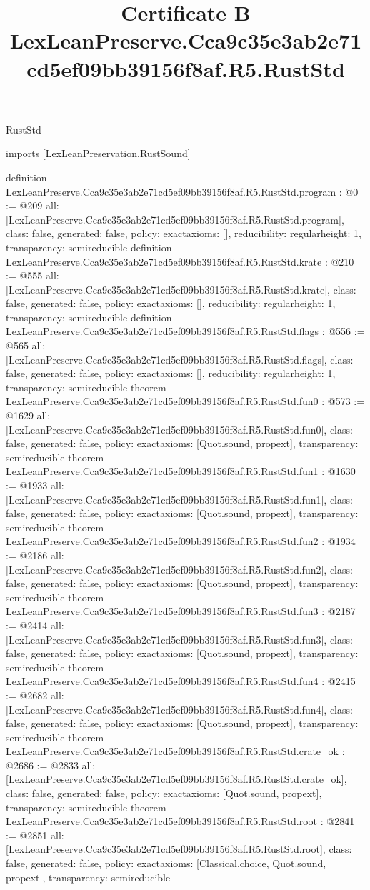 \begin{lexlean}{RustStd}
\title{Certificate B LexLeanPreserve.Cca9c35e3ab2e71cd5ef09bb39156f8af.R5.RustStd}
\begin{coremodule}
imports [LexLeanPreservation.RustSound]

definition LexLeanPreserve.Cca9c35e3ab2e71cd5ef09bb39156f8af.R5.RustStd.program : @0 := @209 {
  all: [LexLeanPreserve.Cca9c35e3ab2e71cd5ef09bb39156f8af.R5.RustStd.program],
  class: false,
  generated: false,
  policy: exact{axioms: []},
  reducibility: regular{height: 1},
  transparency: semireducible
}
definition LexLeanPreserve.Cca9c35e3ab2e71cd5ef09bb39156f8af.R5.RustStd.krate : @210 := @555 {
  all: [LexLeanPreserve.Cca9c35e3ab2e71cd5ef09bb39156f8af.R5.RustStd.krate],
  class: false,
  generated: false,
  policy: exact{axioms: []},
  reducibility: regular{height: 1},
  transparency: semireducible
}
definition LexLeanPreserve.Cca9c35e3ab2e71cd5ef09bb39156f8af.R5.RustStd.flags : @556 := @565 {
  all: [LexLeanPreserve.Cca9c35e3ab2e71cd5ef09bb39156f8af.R5.RustStd.flags],
  class: false,
  generated: false,
  policy: exact{axioms: []},
  reducibility: regular{height: 1},
  transparency: semireducible
}
theorem LexLeanPreserve.Cca9c35e3ab2e71cd5ef09bb39156f8af.R5.RustStd.fun0 : @573 := @1629 {
  all: [LexLeanPreserve.Cca9c35e3ab2e71cd5ef09bb39156f8af.R5.RustStd.fun0],
  class: false,
  generated: false,
  policy: exact{axioms: [Quot.sound, propext]},
  transparency: semireducible
}
theorem LexLeanPreserve.Cca9c35e3ab2e71cd5ef09bb39156f8af.R5.RustStd.fun1 : @1630 := @1933 {
  all: [LexLeanPreserve.Cca9c35e3ab2e71cd5ef09bb39156f8af.R5.RustStd.fun1],
  class: false,
  generated: false,
  policy: exact{axioms: [Quot.sound, propext]},
  transparency: semireducible
}
theorem LexLeanPreserve.Cca9c35e3ab2e71cd5ef09bb39156f8af.R5.RustStd.fun2 : @1934 := @2186 {
  all: [LexLeanPreserve.Cca9c35e3ab2e71cd5ef09bb39156f8af.R5.RustStd.fun2],
  class: false,
  generated: false,
  policy: exact{axioms: [Quot.sound, propext]},
  transparency: semireducible
}
theorem LexLeanPreserve.Cca9c35e3ab2e71cd5ef09bb39156f8af.R5.RustStd.fun3 : @2187 := @2414 {
  all: [LexLeanPreserve.Cca9c35e3ab2e71cd5ef09bb39156f8af.R5.RustStd.fun3],
  class: false,
  generated: false,
  policy: exact{axioms: [Quot.sound, propext]},
  transparency: semireducible
}
theorem LexLeanPreserve.Cca9c35e3ab2e71cd5ef09bb39156f8af.R5.RustStd.fun4 : @2415 := @2682 {
  all: [LexLeanPreserve.Cca9c35e3ab2e71cd5ef09bb39156f8af.R5.RustStd.fun4],
  class: false,
  generated: false,
  policy: exact{axioms: [Quot.sound, propext]},
  transparency: semireducible
}
theorem LexLeanPreserve.Cca9c35e3ab2e71cd5ef09bb39156f8af.R5.RustStd.crate_ok : @2686 := @2833 {
  all: [LexLeanPreserve.Cca9c35e3ab2e71cd5ef09bb39156f8af.R5.RustStd.crate_ok],
  class: false,
  generated: false,
  policy: exact{axioms: [Quot.sound, propext]},
  transparency: semireducible
}
theorem LexLeanPreserve.Cca9c35e3ab2e71cd5ef09bb39156f8af.R5.RustStd.root : @2841 := @2851 {
  all: [LexLeanPreserve.Cca9c35e3ab2e71cd5ef09bb39156f8af.R5.RustStd.root],
  class: false,
  generated: false,
  policy: exact{axioms: [Classical.choice, Quot.sound, propext]},
  transparency: semireducible
}


\end{coremodule}
\end{lexlean}
